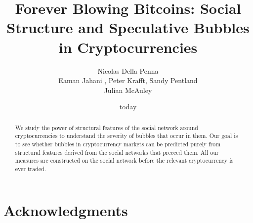 \documentclass{acm_proc_article_sp}%
\title{Forever Blowing Bitcoins: Social Structure and Speculative Bubbles in Cryptocurrencies}
\author{
\alignauthor
Nicolas Della Penna \\%
\alignauthor
Eaman Jahani , Peter Krafft, Sandy Pentland\\


\alignauthor Julian McAuley\\
}
\date{today}
\begin{document}
\maketitle

\begin{abstract}

We study the power of structural features of the social network around cryptocurrencies to understand the severity of bubbles that occur in them. Our goal is to see whether bubbles in cryptocurrency markets can be predicted purely from structural features derived from the social networks that preceed them. All our measures are constructed on the social network before the relevant cryptocurrency is ever traded. 

\end{abstract}

















%






\section{Acknowledgments}

%

%
%
\appendix

\end{document}
